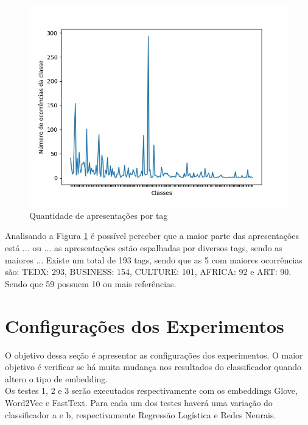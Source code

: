 \documentclass{article}
\begin{document}
\begin{figure}[h!]
\centering
\includegraphics[scale=0.5]{qtdPorTag.JPG}
\caption{Quantidade de apresentações por tag}
\label{fig:qtdPorTag}
\end{figure}

Analisando a Figura \ref{fig:qtdPorTag} é possível perceber que a maior parte das apresentações está ... ou ... as apresentações estão espalhadas por diversos tags, sendo as maiores ... Existe um total de 193 tags, sendo que as 5 com maiores ocorrências são: TEDX: 293, BUSINESS: 154, CULTURE: 101, AFRICA: 92 e ART: 90. Sendo que 59 possuem 10 ou mais referências.


\section{Configurações dos Experimentos\label{configuracoes}}

O objetivo dessa seção é apresentar as configurações dos experimentos. O maior objetivo é verificar se há muita mudança nos resultados do classificador quando altero o tipo de embedding.\\

Os testes 1, 2 e 3 serão executados respectivamente com os embeddings Glove, Word2Vec e FastText. Para cada um dos testes haverá uma variação do classificador a e b, respectivamente Regressão Logística e Redes Neurais.
\end{document}
